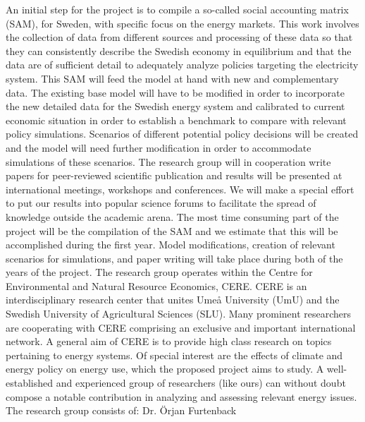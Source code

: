 \documentclass[10pt,a4paper]{article}
\begin{document}
\begin{comment}
\textbf{Modeling electricity sector}
Disaggregated electricity sector
- Coal, Gas, Oil, Nuclear, Hydro, Wind
- to incorporate natural resource constraints on hydro and wind, the expansions of wind and hydro power are bounded by the levels of hydro and wind resource factors, respectively.

\textbf{Scenarios}
- Scenario 1: Phase out of existing nuclear power (without expansion of hydro power plant)
- Scenario 2: Phase out of existing nuclear power plant (with expansion of hydro power plant)
- Scenario 3: Phase out of existing nuclear power plant (without expansion of hydro power plant) and CO2 commitment
- Scenario 4: Phase out of existing nuclear power plant (with expansion of hydro power plant) and CO2 commitment
\end{comment}
An initial step for the project is to compile a so-called social accounting matrix (SAM), for Sweden, with specific focus on the energy markets. This work involves the collection of data from different sources and processing of these data so that they can consistently describe the Swedish economy in equilibrium and that the data are of sufficient detail to adequately analyze policies targeting the electricity system. This SAM will feed the model at hand with new and complementary data.
The existing base model will have to be modified in order to incorporate the new detailed data for the Swedish energy system and calibrated to current economic situation in order to establish a benchmark to compare with relevant policy simulations. Scenarios of different potential policy decisions will be created and the model will need further modification in order to accommodate simulations of these scenarios.
The research group will in cooperation write papers for peer-reviewed scientific publication and results will be presented at international meetings, workshops and conferences. We will make a special effort to put our results into popular science forums to facilitate the spread of knowledge outside the academic arena.
The most time consuming part of the project will be the compilation of the SAM and we estimate that this will be accomplished during the first year. Model modifications, creation of relevant scenarios for simulations, and paper writing will take place during both of the years of the project.
The research group operates within the Centre for Environmental and Natural Resource Economics, CERE. CERE is an interdisciplinary research center that unites Umeå University (UmU) and the Swedish University of Agricultural Sciences (SLU). Many prominent researchers are cooperating with CERE comprising an exclusive and important international network. A general aim of CERE is to provide high class research on topics pertaining to energy systems. Of special interest are the effects of climate and energy policy on energy use, which the proposed project aims to study. A well-established and experienced group of researchers (like ours) can without doubt compose a notable contribution in analyzing and assessing relevant energy issues.
The research group consists of:
Dr. Örjan Furtenback
\end{document}
